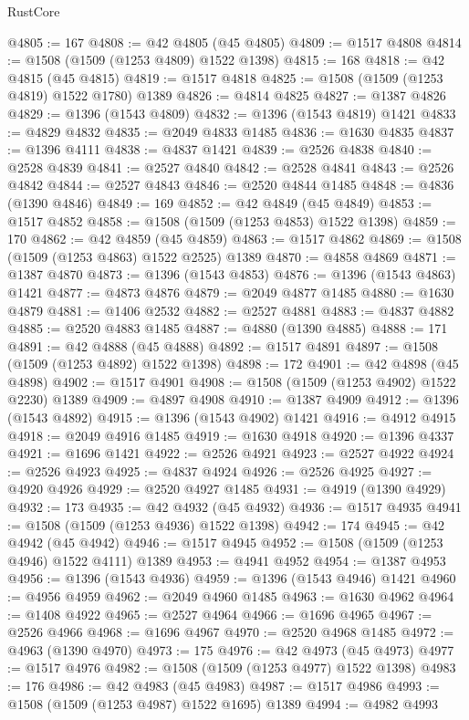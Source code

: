 \begin{lexlean}{RustCore}
\begin{coremodule}
@4805 := 167
@4808 := @42 @4805 (@45 @4805)
@4809 := @1517 @4808
@4814 := @1508 (@1509 (@1253 @4809) @1522 @1398)
@4815 := 168
@4818 := @42 @4815 (@45 @4815)
@4819 := @1517 @4818
@4825 := @1508 (@1509 (@1253 @4819) @1522 @1780) @1389
@4826 := @4814 @4825
@4827 := @1387 @4826
@4829 := @1396 (@1543 @4809)
@4832 := @1396 (@1543 @4819) @1421
@4833 := @4829 @4832
@4835 := @2049 @4833 @1485
@4836 := @1630 @4835
@4837 := @1396 @4111
@4838 := @4837 @1421
@4839 := @2526 @4838
@4840 := @2528 @4839
@4841 := @2527 @4840
@4842 := @2528 @4841
@4843 := @2526 @4842
@4844 := @2527 @4843
@4846 := @2520 @4844 @1485
@4848 := @4836 (@1390 @4846)
@4849 := 169
@4852 := @42 @4849 (@45 @4849)
@4853 := @1517 @4852
@4858 := @1508 (@1509 (@1253 @4853) @1522 @1398)
@4859 := 170
@4862 := @42 @4859 (@45 @4859)
@4863 := @1517 @4862
@4869 := @1508 (@1509 (@1253 @4863) @1522 @2525) @1389
@4870 := @4858 @4869
@4871 := @1387 @4870
@4873 := @1396 (@1543 @4853)
@4876 := @1396 (@1543 @4863) @1421
@4877 := @4873 @4876
@4879 := @2049 @4877 @1485
@4880 := @1630 @4879
@4881 := @1406 @2532
@4882 := @2527 @4881
@4883 := @4837 @4882
@4885 := @2520 @4883 @1485
@4887 := @4880 (@1390 @4885)
@4888 := 171
@4891 := @42 @4888 (@45 @4888)
@4892 := @1517 @4891
@4897 := @1508 (@1509 (@1253 @4892) @1522 @1398)
@4898 := 172
@4901 := @42 @4898 (@45 @4898)
@4902 := @1517 @4901
@4908 := @1508 (@1509 (@1253 @4902) @1522 @2230) @1389
@4909 := @4897 @4908
@4910 := @1387 @4909
@4912 := @1396 (@1543 @4892)
@4915 := @1396 (@1543 @4902) @1421
@4916 := @4912 @4915
@4918 := @2049 @4916 @1485
@4919 := @1630 @4918
@4920 := @1396 @4337
@4921 := @1696 @1421
@4922 := @2526 @4921
@4923 := @2527 @4922
@4924 := @2526 @4923
@4925 := @4837 @4924
@4926 := @2526 @4925
@4927 := @4920 @4926
@4929 := @2520 @4927 @1485
@4931 := @4919 (@1390 @4929)
@4932 := 173
@4935 := @42 @4932 (@45 @4932)
@4936 := @1517 @4935
@4941 := @1508 (@1509 (@1253 @4936) @1522 @1398)
@4942 := 174
@4945 := @42 @4942 (@45 @4942)
@4946 := @1517 @4945
@4952 := @1508 (@1509 (@1253 @4946) @1522 @4111) @1389
@4953 := @4941 @4952
@4954 := @1387 @4953
@4956 := @1396 (@1543 @4936)
@4959 := @1396 (@1543 @4946) @1421
@4960 := @4956 @4959
@4962 := @2049 @4960 @1485
@4963 := @1630 @4962
@4964 := @1408 @4922
@4965 := @2527 @4964
@4966 := @1696 @4965
@4967 := @2526 @4966
@4968 := @1696 @4967
@4970 := @2520 @4968 @1485
@4972 := @4963 (@1390 @4970)
@4973 := 175
@4976 := @42 @4973 (@45 @4973)
@4977 := @1517 @4976
@4982 := @1508 (@1509 (@1253 @4977) @1522 @1398)
@4983 := 176
@4986 := @42 @4983 (@45 @4983)
@4987 := @1517 @4986
@4993 := @1508 (@1509 (@1253 @4987) @1522 @1695) @1389
@4994 := @4982 @4993

\end{coremodule}
\end{lexlean}
